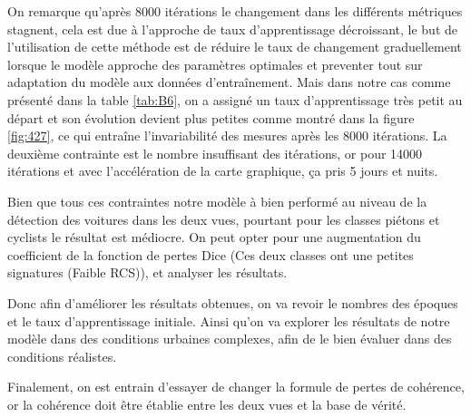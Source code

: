 On remarque qu'après 8000 itérations le changement dans les différents métriques stagnent, cela est due à l'approche de taux d'apprentissage décroissant, le but de l'utilisation de cette méthode est de réduire le taux de changement graduellement lorsque le modèle approche des paramètres optimales et preventer tout sur adaptation du modèle aux données d'entraînement. Mais dans notre cas comme présenté dans la table \ref{tab:B6}, on a assigné un taux d'apprentissage très petit au départ et son évolution devient plus petites comme montré dans la figure \ref{fig:427}, ce qui entraîne l'invariabilité des mesures après les 8000 itérations. La deuxième contrainte est le nombre  insuffisant des itérations, or pour 14000 itérations et avec l'accélération de la carte graphique, ça pris 5 jours et nuits. 

Bien que tous ces contraintes notre modèle à bien performé au niveau de la détection des voitures dans les deux vues, pourtant pour les classes piétons et cyclists le résultat est médiocre. On peut opter pour une augmentation du coefficient de la fonction de pertes Dice (Ces deux classes ont une petites signatures (Faible RCS)), et analyser les résultats.

Donc afin d'améliorer les résultats obtenues, on va revoir le nombres des époques et le taux d'apprentissage initiale. Ainsi qu'on va explorer les résultats de notre modèle dans des conditions urbaines complexes, afin de le bien évaluer dans des conditions réalistes. 

Finalement, on est entrain d'essayer de changer la formule de pertes de cohérence, or la cohérence doit être établie entre les deux vues et la base de vérité.
